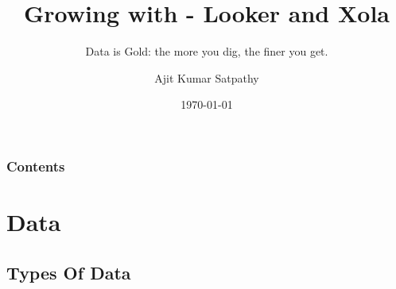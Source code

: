 \documentclass{beamer}
\title{Growing with  - Looker and Xola}
\subtitle{Data is Gold: the more you dig, the finer you get.}
\author{Ajit Kumar Satpathy} %
\date{\today} %
\begin{document}
\begin{frame}
\titlepage %
\end{frame}

\begin{frame}
\frametitle{Contents} %
\tableofcontents %
\end{frame}


\section{Data} %

\subsection{Types Of Data} %
\end{document}
